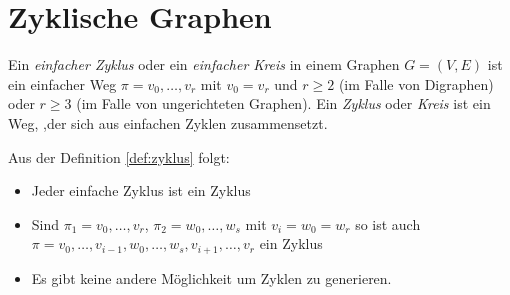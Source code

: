 \section{Zyklische Graphen}
\begin{definition}
	\label{def:zyklus}
Ein \emph{einfacher Zyklus} oder ein \emph{einfacher Kreis} in einem Graphen $G=(V,E)$ ist ein einfacher Weg $\pi =v_0,\ldots,v_r$ mit $v_0=v_r$ und $r\ge2$ (im Falle von Digraphen) oder $r \ge 3$ (im Falle von ungerichteten Graphen).
Ein \emph{Zyklus} oder \emph{Kreis} ist ein Weg, ,der sich aus einfachen Zyklen zusammensetzt.
\end{definition}

\begin{remark}
Aus der Definition \ref{def:zyklus} folgt:
\begin{itemize}
	\item Jeder einfache Zyklus ist ein Zyklus
	\item Sind $\pi_1= v_0,\ldots, v_r$, $\pi_2=w_0,\ldots,w_s$ mit $v_i=w_0=w_r$ so ist auch \\ $\pi=v_0,\ldots,v_{i-1},w_0,\ldots,w_s,v_{i+1},\ldots, v_r$ ein Zyklus
	\item Es gibt keine andere Möglichkeit um Zyklen zu generieren.
\end{itemize}
\end{remark}
